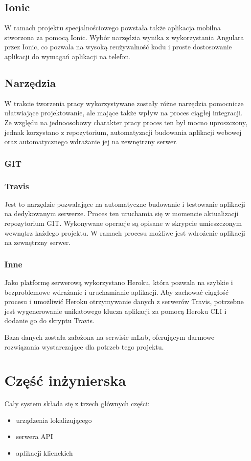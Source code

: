 \documentclass[eng,printmode]{mgr}
\begin{document}
\section{Ionic}
W ramach projektu specjalnościowego powstała także aplikacja mobilna stworzona za pomocą Ionic. Wybór narzędzia wynika z wykorzystania Angulara przez Ionic, co pozwala na wysoką reużywalność kodu i proste dostosowanie aplikacji do wymagań aplikacji na telefon.
\section{Narzędzia}
W trakcie tworzenia pracy wykorzystywane zostały różne narzędzia pomocnicze ułatwiające projektowanie, ale mające także wpływ na proces ciągłej integracji\cite{CI}. Ze względu na jednoosobowy charakter pracy proces ten był mocno uproszczony, jednak korzystano z repozytorium, automatyzacji budowania aplikacji webowej oraz automatycznego wdrażanie jej na zewnętrzny serwer.
\subsection{GIT}
\subsection{Travis}
Jest to narzędzie pozwalające na automatyczne budowanie i testowanie aplikacji na dedykowanym serwerze. Proces ten uruchamia się w momencie aktualizacji repozytorium GIT. Wykonywane operacje są opisane w skrypcie umieszczonym wewnątrz każdego projektu. W ramach procesu możliwe jest wdrożenie aplikacji na zewnętrzny serwer.
\subsection{Inne}
Jako platformę serwerową wykorzystano Heroku\cite{heroku}, która pozwala na szybkie i bezproblemowe wdrażanie i uruchamianie aplikacji. Aby zachować ciągłość procesu i umożliwić Heroku otrzymywanie danych z serwerów Travis, potrzebne jest wygenerowanie unikatowego klucza aplikacji za pomocą Heroku CLI\cite{heroku_cli} i dodanie go do skryptu Travis.

Baza danych została założona na serwisie mLab\cite{mlab}, oferującym darmowe rozwiązania wystarczające dla potrzeb tego projektu.

\chapter{Część inżynierska}
Cały system składa się z trzech głównych części:
\begin{itemize}
\item urządzenia lokalizującego
\item serwera API
\item aplikacji klienckich
\end{itemize}
\end{document}

